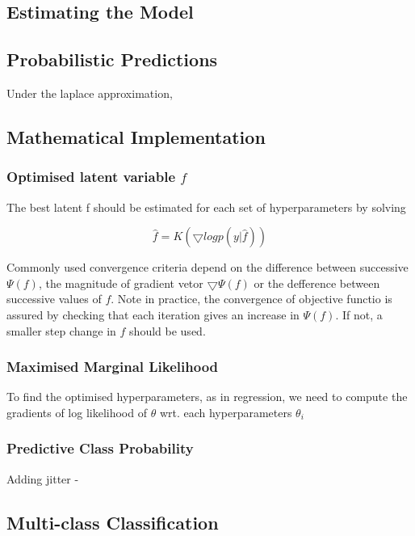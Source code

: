 \documentclass[11pt]{report}
\begin{document}
\subsection{Estimating the Model}


\subsection{Probabilistic Predictions}
Under the laplace approximation, 


\subsection{Mathematical Implementation}
\space

\subsubsection{Optimised latent variable $f$}
The best latent f should be estimated for each set of hyperparameters by solving 

\[\hat{f} = K(\bigtriangledown logp(y|\hat{f}))\]

Commonly used convergence criteria depend on the difference between successive $\Psi (f)$, the magnitude of gradient vetor $\bigtriangledown\Psi (f)$ or the defference between successive values of $f$. Note in practice, the convergence of objective functio is assured by checking that each iteration gives an increase in $\Psi (f)$. If not, a smaller step change in $f$ should be used.


\subsubsection{Maximised Marginal Likelihood}

To find the optimised hyperparameters, as in regression, we need to compute the gradients of log likelihood of $\theta$ wrt. each hyperparameters $\theta_i$ 
 



\subsubsection{Predictive Class Probability}
Adding jitter -
\subsection{Multi-class Classification}
\end{document}
